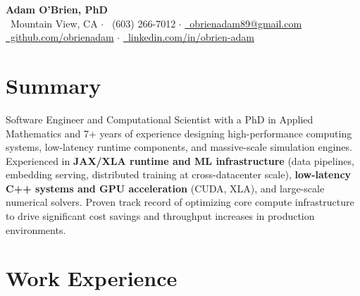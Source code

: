 \documentclass[10pt,letterpaper]{article}
\begin{document}
\pagestyle{empty}

\begin{center}
    {\Huge\bfseries Adam O'Brien, PhD} \\
    \vspace{4pt}
    \small
    \faMapMarker*~Mountain View, CA $\cdot$ \faPhone~(603) 266-7012 $\cdot$ \href{mailto:obrienadam89@gmail.com}{\faEnvelope~obrienadam89@gmail.com} \\
    \href{https://github.com/obrienadam}{\faGithub~github.com/obrienadam} $\cdot$ \href{https://www.linkedin.com/in/obrien-adam/}{\faLinkedin~linkedin.com/in/obrien-adam}
\end{center}

\vspace{6pt}

\section{Summary}
Software Engineer and Computational Scientist with a PhD in Applied Mathematics and 7+ years of experience designing high-performance computing systems, low-latency runtime components, and massive-scale simulation engines. Experienced in \textbf{JAX/XLA runtime and ML infrastructure} (data pipelines, embedding serving, distributed training at cross-datacenter scale), \textbf{low-latency C++ systems and GPU acceleration} (CUDA, XLA), and large-scale numerical solvers. Proven track record of optimizing core compute infrastructure to drive significant cost savings and throughput increases in production environments.

\section{Work Experience}
\end{document}
